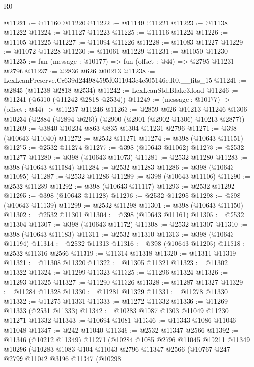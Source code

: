 \begin{lexlean}{R0}
\begin{coremodule}
@11221 := @11160 @11220
@11222 := @11149 @11221
@11223 := @11138 @11222
@11224 := @11127 @11223
@11225 := @11116 @11224
@11226 := @11105 @11225
@11227 := @11094 @11226
@11228 := @11083 @11227
@11229 := @11072 @11228
@11230 := @11061 @11229
@11231 := @11050 @11230
@11235 := fun (message : @10177) => fun (offset : @44) => @2795 @11231 @2796
@11237 := @2836 @626 @10213
@11238 := LexLeanPreserve.Cc639d244984595f0311043c4c505146e.R0.__fits_15
@11241 := @2845 (@11238 @2818 @2534)
@11242 := LexLeanStd.Blake3.load
@11246 := @11241 (@6310 (@11242 @2818 @2534))
@11249 := (message : @10177) -> (offset : @44) -> @11237 @11246
@11263 := @2859
    @626
    @10213
    @11246
    @1306
    @10234
    (@2884 (@2894 @626))
    (@2900 (@2901 (@2902 @1306) @10213 @2877))
@11269 := @3840 @10234 @863 @835 @1304 @11231 @2796
@11271 := @398 (@10643 @11040)
@11272 := @2532 @11271
@11274 := @398 (@10643 @11051)
@11275 := @2532 @11274
@11277 := @398 (@10643 @11062)
@11278 := @2532 @11277
@11280 := @398 (@10643 @11073)
@11281 := @2532 @11280
@11283 := @398 (@10643 @11084)
@11284 := @2532 @11283
@11286 := @398 (@10643 @11095)
@11287 := @2532 @11286
@11289 := @398 (@10643 @11106)
@11290 := @2532 @11289
@11292 := @398 (@10643 @11117)
@11293 := @2532 @11292
@11295 := @398 (@10643 @11128)
@11296 := @2532 @11295
@11298 := @398 (@10643 @11139)
@11299 := @2532 @11298
@11301 := @398 (@10643 @11150)
@11302 := @2532 @11301
@11304 := @398 (@10643 @11161)
@11305 := @2532 @11304
@11307 := @398 (@10643 @11172)
@11308 := @2532 @11307
@11310 := @398 (@10643 @11183)
@11311 := @2532 @11310
@11313 := @398 (@10643 @11194)
@11314 := @2532 @11313
@11316 := @398 (@10643 @11205)
@11318 := @2532 @11316 @2566
@11319 := @11314 @11318
@11320 := @11311 @11319
@11321 := @11308 @11320
@11322 := @11305 @11321
@11323 := @11302 @11322
@11324 := @11299 @11323
@11325 := @11296 @11324
@11326 := @11293 @11325
@11327 := @11290 @11326
@11328 := @11287 @11327
@11329 := @11284 @11328
@11330 := @11281 @11329
@11331 := @11278 @11330
@11332 := @11275 @11331
@11333 := @11272 @11332
@11336 := @11269 @11333 (@2531 @11333)
@11342 := @10283 @1087 @1303 @11049 @11230 @11271 @11332
@11343 := @10694 @1081
@11346 := @11343 @1086 @11046 @11048
@11347 := @242 @11040
@11349 := @2532 @11347 @2566
@11392 := @11346
    (@10212 @11349)
    @11271
    (@10284
      @1085
      @2796
      @11045
      @10211
      @11349
      @10296
      (@10283
        @1083
        @104
        @11043
        @2796
        @11347
        @2566
        (@10767
          @247
          @2799
          @11042
          @3196
          @11347
          (@10298

\end{coremodule}
\end{lexlean}

